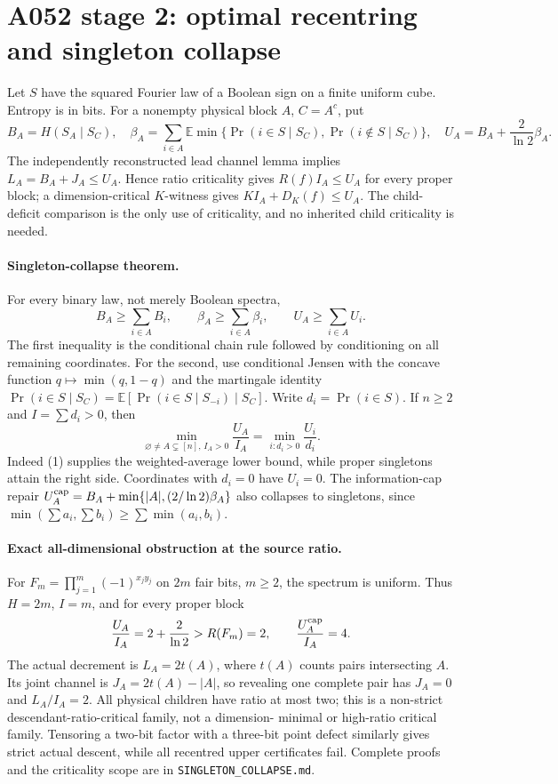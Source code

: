 \documentclass{article}
\begin{document}
\section*{A052 stage 2: optimal recentring and singleton collapse}
Let $S$ have the squared Fourier law of a Boolean sign on a finite uniform
cube. Entropy is in bits. For a nonempty physical block $A$, $C=A^c$, put
\[
 B_A=H(S_A\mid S_C),\quad
 \beta_A=\sum_{i\in A}\mathbb E\min\{\Pr(i\in S\mid S_C),
                                      \Pr(i\notin S\mid S_C)\},
 \quad U_A=B_A+\frac2{\ln2}\beta_A.
\]
The independently reconstructed lead channel lemma implies
$L_A=B_A+J_A\le U_A$. Hence ratio criticality gives
$R(f)I_A\le U_A$ for every proper block; a dimension-critical $K$-witness
gives $KI_A+D_K(f)\le U_A$. The child-deficit comparison is the only use
of criticality, and no inherited child criticality is needed.

\paragraph{Singleton-collapse theorem.}
For every binary law, not merely Boolean spectra,
\[
 B_A\ge\sum_{i\in A}B_i,\qquad
 \beta_A\ge\sum_{i\in A}\beta_i,\qquad
 U_A\ge\sum_{i\in A}U_i.\tag{1}
\]
The first inequality is the conditional chain rule followed by conditioning
on all remaining coordinates. For the second, use conditional Jensen
with the concave function $q\mapsto\min(q,1-q)$ and the martingale
identity $\Pr(i\in S\mid S_C)=\mathbb E[\Pr(i\in S\mid S_{-i})\mid S_C]$.
Write $d_i=\Pr(i\in S)$. If $n\ge2$ and $I=\sum d_i>0$, then
\[
 \min_{\varnothing\ne A\subsetneq[n],\,I_A>0}\frac{U_A}{I_A}
 =\min_{i:d_i>0}\frac{U_i}{d_i}.\tag{2}
\]
Indeed (1) supplies the weighted-average lower bound, while proper
singletons attain the right side. Coordinates with $d_i=0$ have $U_i=0$.
The information-cap repair $U_A^{\rm cap}=B_A+
\min\{|A|,(2/\ln2)\beta_A\}$ also collapses to singletons, since
$\min(\sum a_i,\sum b_i)\ge\sum\min(a_i,b_i)$.

\paragraph{Exact all-dimensional obstruction at the source ratio.}
For $F_m=\prod_{j=1}^m(-1)^{x_jy_j}$ on $2m$ fair bits, $m\ge2$, the
spectrum is uniform. Thus $H=2m$, $I=m$, and for every proper block
\[
 \frac{U_A}{I_A}=2+\frac2{\ln2}>R(F_m)=2,
 \qquad\frac{U_A^{\rm cap}}{I_A}=4.
\]
The actual decrement is $L_A=2t(A)$, where $t(A)$ counts pairs intersecting
$A$. Its joint channel is $J_A=2t(A)-|A|$, so revealing one complete pair
has $J_A=0$ and $L_A/I_A=2$. All physical children have ratio at most two;
this is a non-strict descendant-ratio-critical family, not a dimension-
minimal or high-ratio critical family. Tensoring a two-bit factor with a
three-bit point defect similarly gives strict actual descent, while all
recentred upper certificates fail. Complete proofs and the criticality
scope are in \texttt{SINGLETON\_COLLAPSE.md}.
\end{document}

